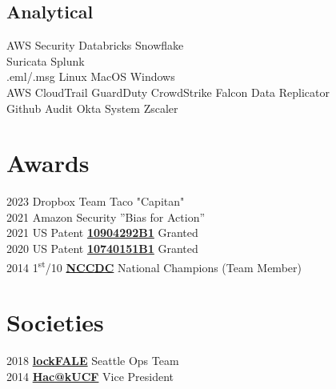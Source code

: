 \documentclass[letterpaper]{deedy-resume} %
\begin{document}
\begin{minipage}[t]{0.33\textwidth}
\subsection{Analytical}
AWS Security \textbullet{} Databricks \textbullet {} Snowflake \\
Suricata \textbullet{} Splunk\\
.eml/.msg \textbullet{} Linux \textbullet{} MacOS\textbullet{} Windows \\
AWS CloudTrail \textbullet{} GuardDuty \textbullet{} CrowdStrike Falcon Data Replicator \\
Github Audit \textbullet{} Okta System \textbullet{} Zscaler \\

\sectionspace %



\section{Awards}
2023 Dropbox Team Taco "Capitan" \\
2021 Amazon Security ”Bias for Action” \\
2021 US Patent \textbf{\href{https://patents.google.com/patent/US10904292B1/en}{10904292B1}} Granted \\
2020 US Patent \textbf{\href{https://patents.google.com/patent/US10740151B1/en}{10740151B1}} Granted \\
2014 1\textsuperscript{st}/10 \textbf{\href{https://www.nationalccdc.org/}{NCCDC}} National Champions (Team Member) \\

\sectionspace %


\section{Societies}
2018 \textbf{\href{https://github.com/lockfale}{lockFALE}} Seattle Ops Team \\
2014 \textbf{\href{https://www.hackucf.org/}{Hac@kUCF}} Vice President \\

\sectionspace %


\end{minipage}
\end{document}
